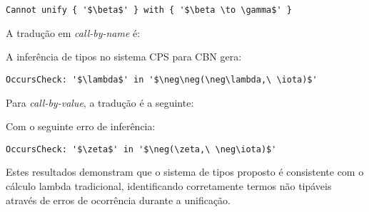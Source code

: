 \lstset{extendedchars=false, escapeinside=''}
\begin{lstlisting}[style=output,caption={Erro de tipo no cálculo lambda original}]
  Cannot unify { '$\beta$' } with { '$\beta \to \gamma$' }
\end{lstlisting}
A tradução em \textit{call-by-name} é:

A inferência de tipos no sistema CPS para CBN gera:
\begin{lstlisting}[style=output,caption={Erro de inferência em CBN}]
  OccursCheck: '$\lambda$' in '$\neg\neg(\neg\lambda,\ \iota)$'
\end{lstlisting}
Para \textit{call-by-value}, a tradução é a seguinte:

Com o seguinte erro de inferência:
\begin{lstlisting}[style=output,caption={Erro de inferência em CBV}]
  OccursCheck: '$\zeta$' in '$\neg(\zeta,\ \neg\iota)$'
\end{lstlisting}
Estes resultados demonstram que o sistema de tipos proposto é consistente com o cálculo lambda tradicional, identificando corretamente termos não tipáveis através de erros de ocorrência durante a unificação.
